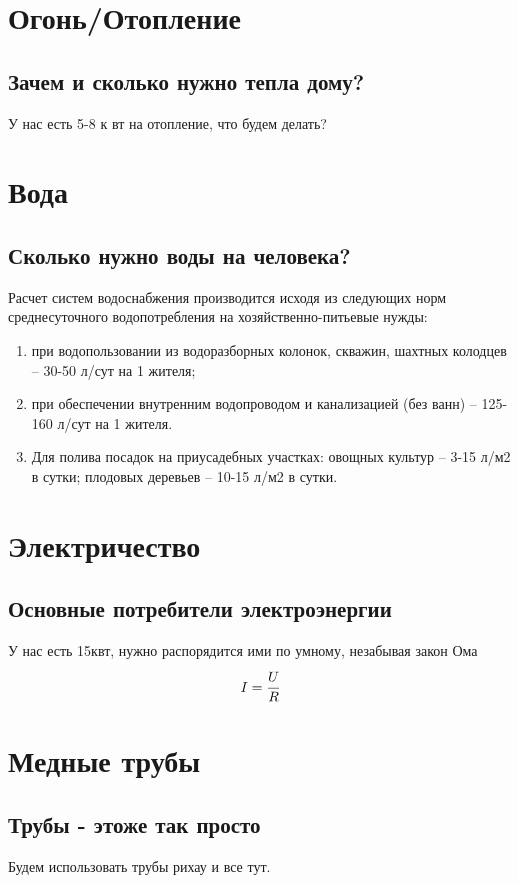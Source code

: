 \documentclass[12pt, twocolumn]{report}
\begin{document}
\part{Огонь/Отопление}
\chapter{Зачем и сколько нужно тепла дому?}
У нас есть 5-8 к	вт на отопление, что будем делать?

\part{Вода}

\chapter{Сколько нужно воды на человека?}

Расчет систем водоснабжения производится исходя из следующих норм среднесуточного водопотребления на хозяйственно-питьевые нужды:

\begin{enumerate}
	\item при водопользовании из водоразборных колонок, скважин, шахтных колодцев -- 30-50 л/сут на 1 жителя;
	\item при обеспечении внутренним водопроводом и канализацией (без ванн) -- 125-160 л/сут на 1 жителя.
	\item Для полива посадок на приусадебных участках: овощных культур -- 3-15 л/м2 в сутки; плодовых деревьев -- 10-15 л/м2 в сутки.
\end{enumerate}





\part{Электричество}
\chapter{Основные потребители электроэнергии}
У нас есть 15квт, нужно распорядится ими по умному, незабывая закон Ома $$ I = \cfrac{U}{R} $$

\part{Медные трубы}
\chapter{Трубы - этоже так просто}
Будем использовать трубы рихау и все тут.
\end{document}
